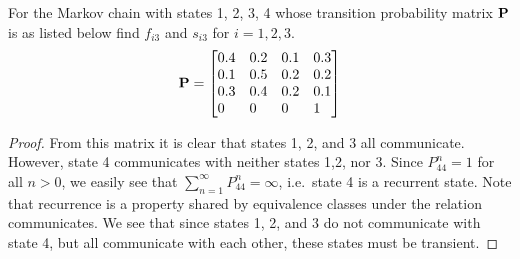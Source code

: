\begin{problem}{4.63}
  For the Markov chain with states 1, 2, 3, 4 whose transition probability matrix
  $\bold{P}$ is as listed below find $f_{i3}$ and $s_{i3}$
  for $i=1, 2, 3$.
  \begin{align*}
    \bold{P} =
    \begin{bmatrix}
      0.4 & 0.2 & 0.1 & 0.3 \\
      0.1 & 0.5 & 0.2 & 0.2 \\
      0.3 & 0.4 & 0.2 & 0.1 \\
      0\phantom{.1} & 0\phantom{.1} & 0\phantom{.1} & 1\phantom{.1}
    \end{bmatrix}
  \end{align*}
\end{problem}

\begin{proof}
  From this matrix it is clear that states 1, 2, and 3 all communicate. However, state 4 communicates
  with neither states 1,2, nor 3. Since $P_{44}^n = 1$ for all $n > 0$, we easily see that
  $\sum_{n=1}^\infty P_{44}^n = \infty$, i.e.\ state 4 is a recurrent state. Note that
  recurrence is a property shared by equivalence classes under the relation communicates.
  We see that since states 1, 2, and 3 do not communicate with state 4, but all communicate with each other,
  these states must be transient.


\end{proof}
